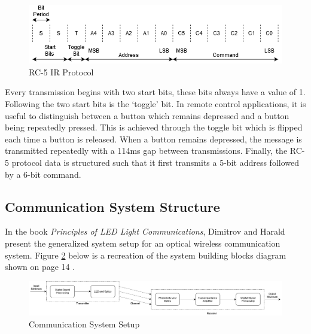 \begin{figure}[H]
	\centering
	\includegraphics[width=0.8\linewidth]{figures/litreview/rc5_protocol.png}
	\caption{RC-5 IR Protocol}
	\label{fig:rc_5_protocol}
\end{figure}

Every transmission begins with two start bits, these bits always have a value of 1. Following the two start bits is the `toggle' bit. In remote control applications, it is useful to distinguish between a button which remains depressed and a button being repeatedly pressed. This is achieved through the toggle bit which is flipped each time a button is released. When a button remains depressed, the message is transmitted repeatedly with a 114ms gap between transmissions. Finally, the RC-5 protocol data is structured such that it first transmits a 5-bit address followed by a 6-bit command.




\subsection{Communication System Structure} 

In the book \textit{Principles of LED Light Communications}, Dimitrov and Harald present the generalized system setup for an optical wireless communication system. Figure \ref{fig:system_configuartion_lit} below is a recreation of the system building blocks diagram shown on page 14 \cite{Dimitrov2015}.

\begin{figure}[H]
	\centering
	\includegraphics[width=\linewidth]{figures/litreview/system_configuartion_lit.png}
	\caption{Communication System Setup}
	\label{fig:system_configuartion_lit}
\end{figure}

